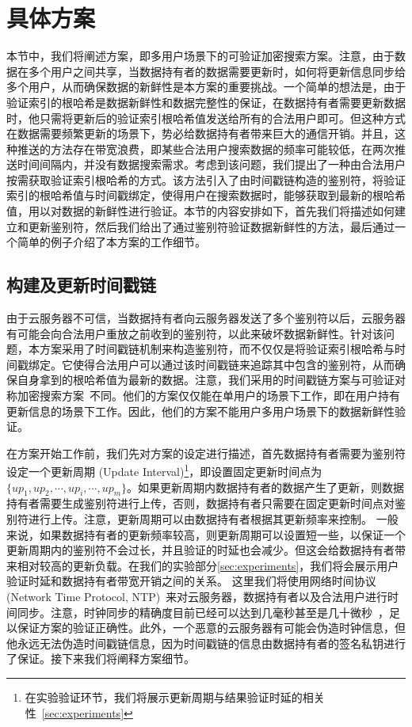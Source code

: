 \section{具体方案}
本节中，我们将阐述\multi 方案，即多用户场景下的可验证加密搜索方案。注意，由于数据在多个用户之间共享，当数据持有者的数据需要更新时，如何将更新信息同步给多个用户，从而确保数据的新鲜性是本方案的重要挑战。一个简单的想法是，由于验证索引的根哈希是数据新鲜性和数据完整性的保证，在数据持有者需要更新数据时，他只需将更新后的验证索引根哈希值发送给所有的合法用户即可。但这种方式在数据需要频繁更新的场景下，势必给数据持有者带来巨大的通信开销。并且，这种推送的方法存在带宽浪费，即某些合法用户搜索数据的频率可能较低，在两次推送时间间隔内，并没有数据搜索需求。考虑到该问题，我们提出了一种由合法用户按需获取验证索引根哈希的方式。该方法引入了由时间戳链构造的鉴别符，将验证索引的根哈希值与时间戳绑定，使得用户在搜索数据时，能够获取到最新的根哈希值，用以对数据的新鲜性进行验证。本节的内容安排如下，首先我们将描述如何建立和更新鉴别符，然后我们给出了通过鉴别符验证数据新鲜性的方法，最后通过一个简单的例子介绍了本方案的工作细节。

\subsection{构建及更新时间戳链}
由于云服务器不可信，当数据持有者向云服务器发送了多个鉴别符以后，云服务器有可能会向合法用户重放之前收到的鉴别符，以此来破坏数据新鲜性。针对该问题，本方案采用了时间戳链机制来构造鉴别符，而不仅仅是将验证索引根哈希与时间戳绑定。它使得合法用户可以通过该时间戳链来追踪其中包含的鉴别符，从而确保自身拿到的根哈希值为最新的数据。注意，我们采用的时间戳链方案与可验证对称加密搜索方案~\cite{stefanov2014practical}不同。他们的方案仅仅能在单用户的场景下工作，即在用户持有更新信息的场景下工作。因此，他们的方案不能用户多用户场景下的数据新鲜性验证。



在方案开始工作前，我们先对方案的设定进行描述，首先数据持有者需要为鉴别符设定一个更新周期 (Update Interval)\footnote{在实验验证环节，我们将展示更新周期与结果验证时延的相关性~\ref{sec:experiments}}，即设置固定更新时间点为$\{up_1, up_2, \cdots, up_i, \cdots, up_m\}$。如果更新周期内数据持有者的数据产生了更新，则数据持有者需要生成鉴别符进行上传，否则，数据持有者只需要在固定更新时间点对鉴别符进行上传。注意，更新周期可以由数据持有者根据其更新频率来控制。 一般来说，如果数据持有者的更新频率较高，则更新周期可以设置短一些，以保证一个更新周期内的鉴别符不会过长，并且验证的时延也会减少。但这会给数据持有者带来相对较高的更新负载。在我们的实验部分\ref{sec:experiments}，我们将会展示用户验证时延和数据持有者带宽开销之间的关系。
这里我们将使用网络时间协议 (Network Time Protocol, NTP)~\cite{mills1991internet, mills2010network}来对云服务器，数据持有者以及合法用户进行时间同步。注意，时钟同步的精确度目前已经可以达到几毫秒甚至是几十微秒~\cite{kopetz1987clock, elson2002fine, zhou2007accurate}，足以保证\multi 方案的验证正确性。此外，一个恶意的云服务器有可能会伪造时钟信息，但他永远无法伪造时间戳链信息，因为时间戳链的信息由数据持有者的签名私钥进行了保证。接下来我们将阐释方案细节。


